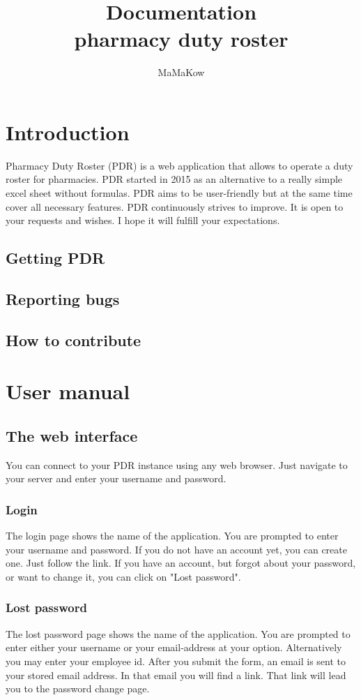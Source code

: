 \documentclass[12pt,a4paper,titlepage]{report}
\author{MaMaKow}
\title{Documentation \\pharmacy duty roster}
\begin{document}
\maketitle
\tableofcontents


\chapter{Introduction}
Pharmacy Duty Roster (PDR) is a web application that allows to operate a duty roster for pharmacies.
PDR started in 2015 as an alternative to a really simple excel sheet without formulas.
PDR aims to be user-friendly but at the same time cover all necessary features.
PDR continuously strives to improve. It is open to your requests and wishes.
I hope it will fulfill your expectations.
\section{Getting PDR}
\section{Reporting bugs}
\section{How to contribute}


\chapter{User manual}


\section{The web interface}
You can connect to your PDR instance using any web browser. Just navigate to your server and enter your username and password.

\subsection{Login}
The login page shows the name of the application. You are prompted to enter your username and password.
If you do not have an account yet, you can create one. Just follow the link.
If you have an account, but forgot about your password, or want to change it, you can click on "Lost password".

\subsection{Lost password}
The lost password page shows the name of the application. You are prompted to enter either your username or your email-address at your option. Alternatively you may enter your employee id. 
After you submit the form, an email is sent to your stored email address.
In that email you will find a link. That link will lead you to the password change page.
\end{document}
